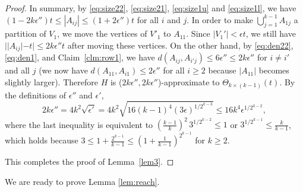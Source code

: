 \documentclass[reqno]{amsart}
\theoremstyle{plain}
\def\eps{\epsilon}
\begin{document}
\begin{proof}
In summary, by \eqref{eq:size22}, \eqref{eq:size21}, \eqref{eq:size1u} and \eqref{eq:size1l}, we have $(1- 2k\eps'') t \le |A_{ij}| \le (1+ 2\eps'') t$ for all $i$ and $j$. In order to make $\bigcup_{j=1}^{k-1} A_{1j}$ a partition of $V_1$, we move the vertices of $V'_1$ to $A_{11}$. Since $|V_1'|<\eps t$, we still have $| |A_{ij}| - t | \le 2k\eps'' t$ after moving these vertices. On the other hand, by \eqref{eq:den22}, \eqref{eq:den1}, and Claim~\ref{clm:row1}, we have $d(A_{ij}, A_{i'j}) \le 6\eps'' \le 2k\eps''$ for $i\ne i'$ and all $j$ (we now have $d(A_{11}, A_{i1}) \le 2\eps''$ for all $i\ge 2$ because $|A_{11}|$ becomes slightly larger). Therefore $H$ is ($2k\eps'', 2k\eps''$)-approximate to $\Theta_{k\times (k-1)} (t)$. By the definitions of $\eps''$ and $\eps'$,
\[
2k \eps'' = 4k^2 \sqrt{\eps'} = 4k^2 \sqrt{16 (k-1)^4 (3\eps)^{1/2^{k-3}} } \le16 k^4 \eps^{1/ 2^{k-2}},
\]
where the last inequality is equivalent to $(\frac{k-1}{k})^2 \, 3^{1/2^{k-2}} \le 1$ or $3^{1/ 2^{k-1}} \le \frac{k}{k-1}$, which holds because $3\le 1 + \frac{2^{k-1}}{k-1} \le (1 + \frac{1}{k-1})^{2^{k-1}}$ for $k\ge 2$.

This completes the proof of Lemma~\ref{lem3}.
\end{proof}



\bigskip








We are ready to prove Lemma \ref{lem:reach}.
\end{document}
